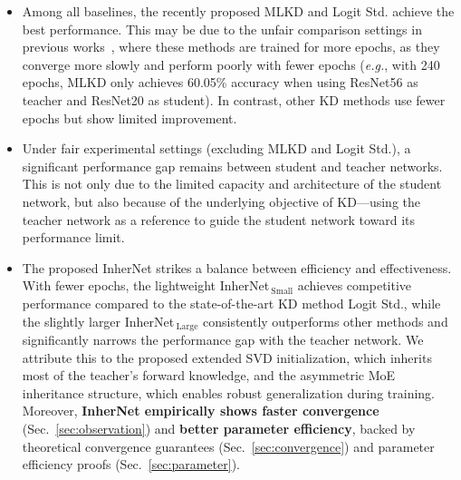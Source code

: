 \documentclass{article} %
\begin{document}
\begin{itemize}[leftmargin=*]
    \item{Among all baselines, the recently proposed MLKD and Logit Std. achieve the best performance. This may be due to the unfair comparison settings in previous works~\citep{jin2023multi, sun2024logit}, where these methods are trained for more epochs, as they converge more slowly and perform poorly with fewer epochs (\textit{e.g.}, with 240 epochs, MLKD only achieves 60.05\% accuracy when using ResNet56 as teacher and ResNet20 as student). In contrast, other KD methods use fewer epochs but show limited improvement.}
    \item{Under fair experimental settings (excluding MLKD and Logit Std.), a significant performance gap remains between student and teacher networks. This is not only due to the limited capacity and architecture of the student network, but also because of the underlying objective of KD—using the teacher network as a reference to guide the student network toward its performance limit.}
    \item{The proposed InherNet strikes a balance between efficiency and effectiveness. With fewer epochs, the lightweight InherNet$_{\ \text{Small}}$ achieves competitive performance compared to the state-of-the-art KD method Logit Std., while the slightly larger InherNet$_{\ \text{Large}}$ consistently outperforms other methods and significantly narrows the performance gap with the teacher network. We attribute this to the proposed extended SVD initialization, which inherits most of the teacher's forward knowledge, and the asymmetric MoE inheritance structure, which enables robust generalization during training. Moreover, \textbf{InherNet empirically shows faster convergence} (Sec.~\ref{sec:observation}) and \textbf{better parameter efficiency}, backed by theoretical convergence guarantees (Sec.~\ref{sec:convergence}) and parameter efficiency proofs (Sec.~\ref{sec:parameter}).}
\end{itemize}
\end{document}
